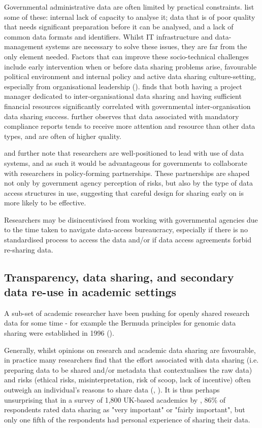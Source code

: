 \documentclass{CUP-JNL-DAP}%
\begin{document}
Governmental administrative data are often limited by practical constraints. \cite{allard_state_2018} list some of these: internal lack of capacity to analyse it; data that is of poor quality that needs significant preparation before it can be analysed, and a lack of common data formats and identifiers. Whilst IT infrastructure and data-management systems are necessary to solve these issues, they are far from the only element needed. Factors that can improve these socio-technical challenges include early intervention when or before data sharing problems arise, favourable political environment and internal policy and active data sharing culture-setting, especially from organisational leadership (\cite{dawes_need_2009}). \cite{gil-garcia_government_2016} finds that both having a project manager dedicated to inter-organisational data sharing and having sufficient financial resources significantly correlated with governmental inter-organisation data sharing success.  \cite{allard_state_2018} further observes that data associated with mandatory compliance reports tends to receive more attention and resource than other data types, and are often of higher quality.

\cite{allard_state_2018} and \cite{graham_navigating_2016} further note that researchers are well-positioned to lead with use of data systems, and as such it would be advantageous for governments to collaborate with researchers in policy-forming partnerships. These partnerships are shaped not only by government agency perception of risks, but also by the type of data access structures in use, suggesting that careful design for sharing early on is more likely to be effective. 

Researchers may be disincentivised from working with governmental agencies due to the time taken to navigate data-access bureaucracy, especially if there is no standardised process to access the data and/or if data access agreements forbid re-sharing data.  

\subsection{Transparency, data sharing, and secondary data re-use in academic settings}
A sub-set of academic researcher have been pushing for openly shared research data for some time - for example the Bermuda principles for genomic data sharing were established in 1996 (\cite{maxson_jones_bermuda_2018}).

Generally, whilst opinions on research and academic data sharing are favourable, in practice many researchers find that the effort associated with data sharing (i.e. preparing data to be shared and/or metadata that contextualises the raw data) and risks (ethical risks, misinterpretation, risk of scoop, lack of incentive) often outweigh an individual’s reasons to share data (\cite{Yimei_Zhu_Open_access_in_uk}, \cite{datasharing_sociology}). It is thus perhaps unsurprising that in a survey of 1,800 UK-based academics by \cite{Yimei_Zhu_Open_access_in_uk}, 86\% of respondents rated data sharing as "very important" or "fairly important", but only one fifth of the respondents had personal experience of sharing their data. 
\end{document}
